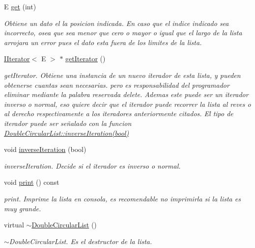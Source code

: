 \begin{DoxyCompactItemize}
E \hyperlink{classDoubleCircularList_aa00bc8fd524af1ba208f85d8816dec52}{get} (int)
\begin{DoxyCompactList}\small\item\em Obtiene un dato el la posicion indicada. En caso que el indice indicado sea incorrecto, osea que sea menor que cero o mayor o igual que el largo de la lista arrojara un error pues el dato esta fuera de los limites de la lista. \end{DoxyCompactList}\item 
\hyperlink{classIIterator}{I\-Iterator}$<$ E $>$ $\ast$ \hyperlink{classDoubleCircularList_abba1430e956c7660a88f786bfd8d87ad}{get\-Iterator} ()
\begin{DoxyCompactList}\small\item\em get\-Iterator. Obtiene una instancia de un nuevo iterador de esta lista, y pueden obtenerse cuantas sean necesarias. pero es responsabilidad del programador eliminar mediante la palabra reservada delete. Ademas este puede ser un iterador inverso o normal, eso quiere decir que el iterador puede recorrer la lista al reves o al derecho respectivamente a los iteradores anteriormente citados. El tipo de iterador puede ser señalado con la funcion \hyperlink{classDoubleCircularList_a77212c5d6ad148c99a06009a8c44128b}{Double\-Circular\-List\-::inverse\-Iteration(bool)}\end{DoxyCompactList}\item 
void \hyperlink{classDoubleCircularList_a77212c5d6ad148c99a06009a8c44128b}{inverse\-Iteration} (bool)
\begin{DoxyCompactList}\small\item\em inverse\-Iteration. Decide si el iterador es inverso o normal. \end{DoxyCompactList}\item 
\hypertarget{classDoubleCircularList_a56330353baf42afa3c49e2ade77c9e07}{void \hyperlink{classDoubleCircularList_a56330353baf42afa3c49e2ade77c9e07}{print} () const }\label{classDoubleCircularList_a56330353baf42afa3c49e2ade77c9e07}

\begin{DoxyCompactList}\small\item\em print. Imprime la lista en consola, es recomendable no imprimirla si la lista es muy grande. \end{DoxyCompactList}\item 
\hypertarget{classDoubleCircularList_a26dba8b85983742cfbf38886245fe2a4}{virtual \hyperlink{classDoubleCircularList_a26dba8b85983742cfbf38886245fe2a4}{$\sim$\-Double\-Circular\-List} ()}\label{classDoubleCircularList_a26dba8b85983742cfbf38886245fe2a4}

\begin{DoxyCompactList}\small\item\em $\sim$\-Double\-Circular\-List. Es el destructor de la lista. \end{DoxyCompactList}\end{DoxyCompactItemize}
